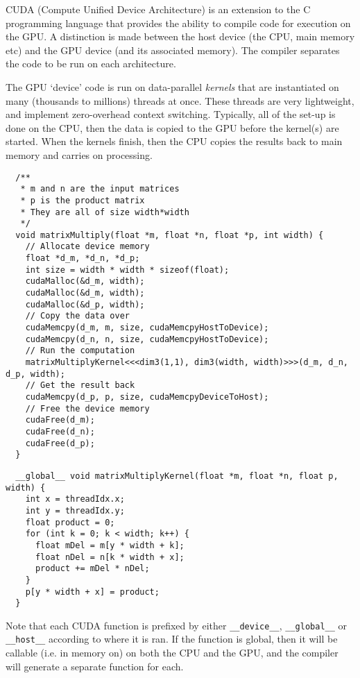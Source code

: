 CUDA (Compute Unified Device Architecture) is an extension to the C
programming language that provides the ability to compile code for
execution on the GPU. A distinction is made between the host device
(the CPU, main memory etc) and the GPU device (and its associated
memory). The compiler separates the code to be run on each
architecture.

The GPU `device' code is run on data-parallel \textit{kernels} that
are instantiated on many (thousands to millions) threads at
once. These threads are very lightweight, and implement zero-overhead
context switching. Typically, all of the set-up is done on the CPU,
then the data is copied to the GPU before the kernel(s) are
started. When the kernels finish, then the CPU copies the results back
to main memory and carries on processing.

\begin{verbatim}
  /**
   * m and n are the input matrices
   * p is the product matrix
   * They are all of size width*width
   */
  void matrixMultiply(float *m, float *n, float *p, int width) {
    // Allocate device memory
    float *d_m, *d_n, *d_p;
    int size = width * width * sizeof(float);
    cudaMalloc(&d_m, width);
    cudaMalloc(&d_m, width);
    cudaMalloc(&d_p, width);
    // Copy the data over
    cudaMemcpy(d_m, m, size, cudaMemcpyHostToDevice);
    cudaMemcpy(d_n, n, size, cudaMemcpyHostToDevice);
    // Run the computation
    matrixMultiplyKernel<<<dim3(1,1), dim3(width, width)>>>(d_m, d_n, d_p, width);
    // Get the result back
    cudaMemcpy(d_p, p, size, cudaMemcpyDeviceToHost);
    // Free the device memory
    cudaFree(d_m);
    cudaFree(d_n);
    cudaFree(d_p);
  }
\end{verbatim}

\begin{verbatim}
  __global__ void matrixMultiplyKernel(float *m, float *n, float p, width) {
    int x = threadIdx.x;
    int y = threadIdx.y;
    float product = 0;
    for (int k = 0; k < width; k++) {
      float mDel = m[y * width + k];
      float nDel = n[k * width + x];
      product += mDel * nDel;
    }
    p[y * width + x] = product;
  }
\end{verbatim}

Note that each CUDA function is prefixed by
either \texttt{\_\_device\_\_}, \texttt{\_\_global\_\_}
or \texttt{\_\_host\_\_} according to where it is ran. If the function
is global, then it will be callable (i.e. in memory on) on both the
CPU and the GPU, and the compiler will generate a separate function
for each.

